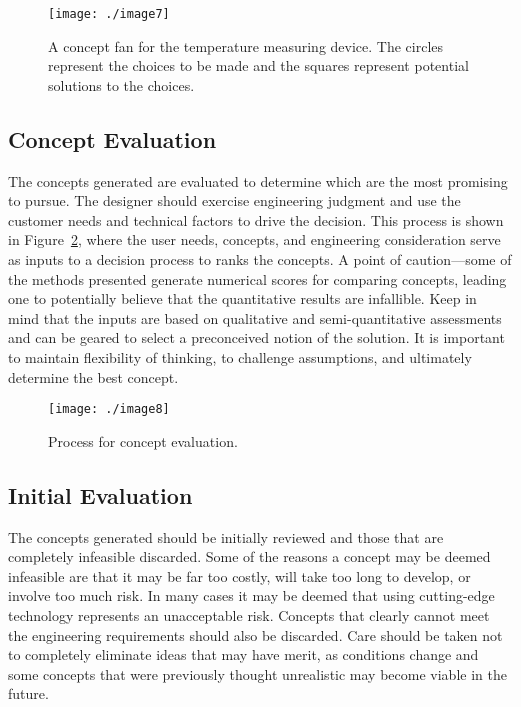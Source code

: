 \begin{figure}
\texttt{[image: ./image7]}
\caption{A concept fan for the temperature measuring device.
The circles represent the choices to be made and the squares represent
potential solutions to the choices.}
\label{figure:conceptFan}
\end{figure}


\subsection{Concept Evaluation}\label{concept-evaluation}

The concepts generated are evaluated to determine which are the most
promising to pursue. The designer should exercise engineering judgment
and use the customer needs and technical factors to drive the decision.
This process is shown in 
Figure~\ref{figure:conceptFan}, where the user needs, concepts, and
engineering consideration serve as inputs to a decision process to ranks
the concepts. A point of caution---some of the methods presented
generate numerical scores for comparing concepts, leading one to
potentially believe that the quantita­tive results are infallible. Keep
in mind that the inputs are based on qualitative and semi-quantitative
assessments and can be geared to select a preconceived notion of the
solution. It is important to maintain flexibility of thinking, to
challenge assumptions, and ultimately determine the best concept.

\begin{figure}
\texttt{[image: ./image8]}
\caption{Process for concept evaluation.}
\label{figure:conceptFan}
\end{figure}


\subsection{Initial Evaluation}
\label{subsection:initial-evaluation}

The concepts generated should be initially reviewed and those that are
completely infeasible discarded. Some of the reasons a concept may be
deemed infeasible are that it may be far too costly, will take too long
to develop, or involve too much risk. In many cases it may be deemed
that using cutting-edge technology represents an unacceptable risk.
Concepts that clearly cannot meet the engineering requirements should
also be discarded. Care should be taken not to completely eliminate
ideas that may have merit, as conditions change and some concepts that
were previously thought unrealistic may become viable in the future.

